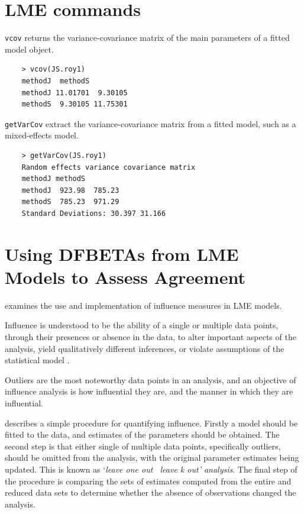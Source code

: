 \documentclass[Main.tex]{subfiles}
\begin{document}
\chapter{LME commands}

\texttt{vcov} returns the variance-covariance matrix of the main parameters of a fitted model object.
\begin{framed}
	\begin{verbatim}
	> vcov(JS.roy1)
	methodJ  methodS
	methodJ 11.01701  9.30105
	methodS  9.30105 11.75301
	\end{verbatim}
\end{framed}

\texttt{getVarCov} extract the variance-covariance matrix from a fitted model, such as a mixed-effects model.
\begin{framed}
	\begin{verbatim}
	> getVarCov(JS.roy1)
	Random effects variance covariance matrix
	methodJ methodS
	methodJ  923.98  785.23
	methodS  785.23  971.29
	Standard Deviations: 30.397 31.166 
	\end{verbatim}
\end{framed}	


\chapter{Using DFBETAs from LME Models to Assess Agreement}
	
	
	\citet{schabenberger} examines the use and implementation of
	influence measures in LME models.
	
	Influence is understood to be the ability of a single or multiple
	data points, through their presences or absence in the data, to
	alter important aspects of the analysis, yield qualitatively
	different inferences, or violate assumptions of the statistical
	model \citep{schabenberger}.
	
	Outliers are the most noteworthy data points in an analysis, and
	an objective of influence analysis is how influential they are,
	and the manner in which they are influential.
	
	\citet{schabenberger} describes a simple procedure for quantifying
	influence. Firstly a model should be fitted to the data, and
	estimates of the parameters should be obtained. The second step is
	that either single of multiple data points, specifically outliers,
	should be omitted from the analysis, with the original parameter
	estimates being updated. This is known as `\textit{leave one out \ leave k
	out' analysis}. The final step of the procedure is comparing the
	sets of estimates computed from the entire and reduced data sets
	to determine whether the absence of observations changed the
	analysis.
	
\end{document}
